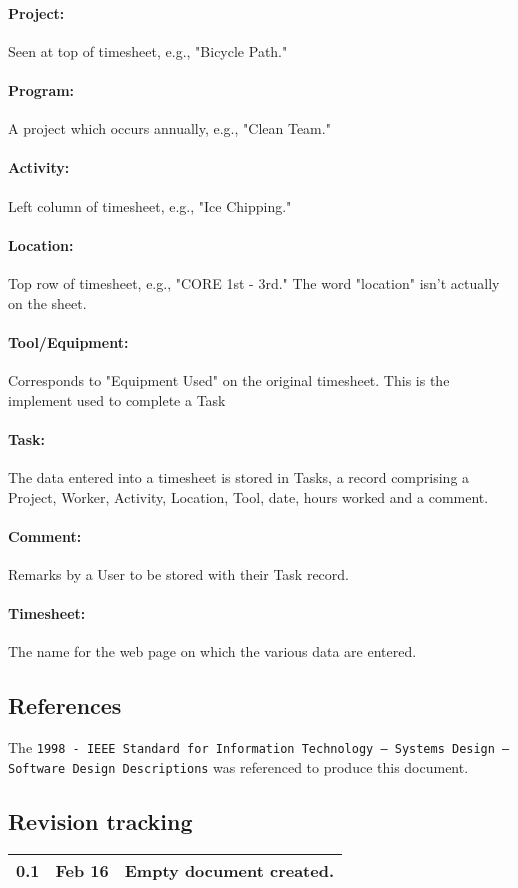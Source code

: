 \documentclass[12pt]{article}
\begin{document}
\paragraph{Project:} Seen at top of timesheet, e.g., "Bicycle Path."
\paragraph{Program:} A project which occurs annually, e.g., "Clean Team."
\paragraph{Activity:} Left column of timesheet, e.g., "Ice Chipping."
\paragraph{Location:} Top row of timesheet, e.g., "CORE 1st - 3rd." The word "location" isn't actually on the sheet.
\paragraph{Tool/Equipment:} Corresponds to "Equipment Used" on the original timesheet. This is the implement used to complete a Task
\paragraph{Task:} The data entered into a timesheet is stored in Tasks, a record comprising a Project, Worker, Activity, Location, Tool, date, hours worked and a comment.
\paragraph{Comment:} Remarks by a User to be stored with their Task record.
\paragraph{Timesheet:} The name for the web page on which the various data are entered.

\subsection{References}
The {\tt 1998 - IEEE Standard for Information Technology -- Systems Design -- Software Design Descriptions} was referenced to produce this document.

\subsection{Revision tracking}
\begin{tabular}{|l|r|p{4.6in}|}
\hline
0.1 & Feb 16 & Empty document created.\\
\hline
\end{tabular}
\end{document}
